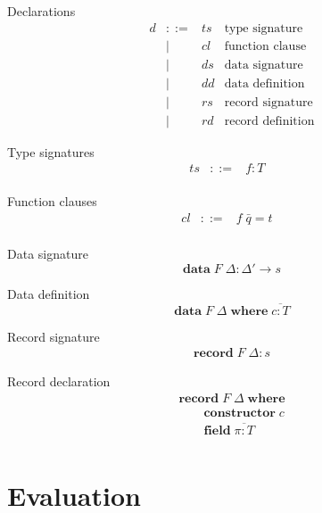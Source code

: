 \documentclass[acmlarge]{acmart}\settopmatter{}
\renewcommand{\|}{\mid}
\begin{document}
Declarations
\[
\begin{array}{lrll}
d  & ::=  & \mathit{ts} & \mbox{type signature}
\\ & \mid & \mathit{cl} & \mbox{function clause}
\\ & \mid & \mathit{ds} & \mbox{data signature}
\\ & \mid & \mathit{dd} & \mbox{data definition}
\\ & \mid & \mathit{rs} & \mbox{record signature}
\\ & \mid & \mathit{rd} & \mbox{record definition}

\end{array}
 \]

Type signatures
\[\begin{array}{lrll}
ts &::=& f : T &\\
\end{array} \]

Function clauses
\[\begin{array}{lrll}
cl &::=& f\; \bar{q} = t &\\
\end{array} \]

Data signature
\[
\textbf{data}\; F\; \Delta : \Delta' \rightarrow s
\]

Data definition
\[
\textbf{data}\; F\; \Delta \;\textbf{where}\; \overline{c : T}
\]

Record signature
\[ \begin{array}{l}
\textbf{record}\; F\; \Delta : s
\end{array}\]

Record declaration
\[ \begin{array}{l}
\textbf{record}\; F\; \Delta \; \textbf{where} \\
\qquad  \textbf{constructor}\; c \\
\qquad  \textbf{field}\; \overline{\pi : T} \\
\end{array}\]




\section{Evaluation}
\label{sec:evaluation}

\newcommand{\datasig}{\text{data } F\; \Delta : \Delta' \to s \text{ where } \overline{c : T}}
\newcommand{\recsig}{\text{record } F\;\Delta : s \text{ where
    $c : T$; } \text{projections } \overline{\pi : T} }
\newcommand{\funsig}{\text{function } f : T \text{ where } \overline{cl}}
\end{document}
